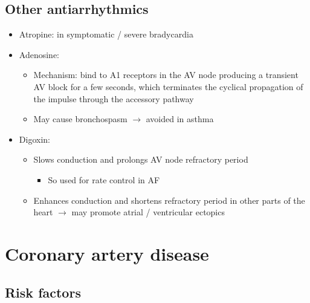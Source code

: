 \documentclass[
  12pt,
]{memoir}
\providecommand{\tightlist}{%
  \setlength{\itemsep}{0pt}\setlength{\parskip}{0pt}}
\begin{document}
\hypertarget{other-antiarrhythmics}{%
\subsection{Other antiarrhythmics}\label{other-antiarrhythmics}}

\label{ssec:otheranti}

\begin{itemize}
\tightlist
\item
  Atropine: in symptomatic / severe bradycardia
\item
  Adenosine:

  \begin{itemize}
  \tightlist
  \item
    Mechanism: bind to A1 receptors in the AV node producing a transient
    AV block for a few seconds, which terminates the cyclical
    propagation of the impulse through the accessory pathway
  \item
    May cause bronchospasm \(\rightarrow\) avoided in asthma
  \end{itemize}
\item
  Digoxin:

  \begin{itemize}
  \tightlist
  \item
    Slows conduction and prolongs AV node refractory period

    \begin{itemize}
    \tightlist
    \item
      So used for rate control in AF
    \end{itemize}
  \item
    Enhances conduction and shortens refractory period in other parts of
    the heart \(\rightarrow\) may promote atrial / ventricular ectopics
  \end{itemize}
\end{itemize}

\hypertarget{coronary-artery-disease-1}{%
\section{Coronary artery disease}\label{coronary-artery-disease-1}}

\hypertarget{risk-factors}{%
\subsection{Risk factors}\label{risk-factors}}
\end{document}
